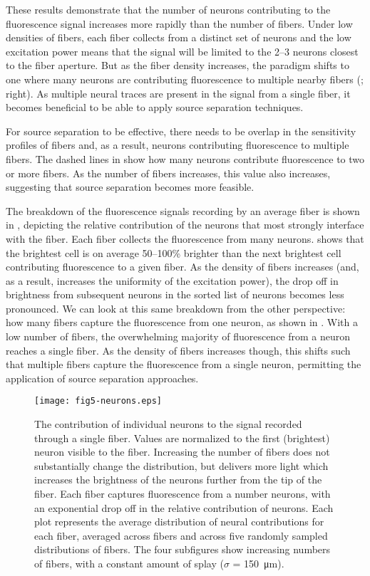 These results demonstrate that the number of neurons contributing to the fluorescence signal increases more rapidly than the number of fibers. Under low densities of fibers, each fiber collects from a distinct set of neurons and the low excitation power means that the signal will be limited to the 2--3 neurons closest to the fiber aperture. But as the fiber density increases, the paradigm shifts to one where many neurons are contributing fluorescence to multiple nearby fibers (; right). As multiple neural traces are present in the signal from a single fiber, it becomes beneficial to be able to apply source separation techniques.

For source separation to be effective, there needs to be overlap in the sensitivity profiles of fibers and, as a result, neurons contributing fluorescence to multiple fibers. The dashed lines in  show how many neurons contribute fluorescence to two or more fibers. As the number of fibers increases, this value also increases, suggesting that source separation becomes more feasible.

The breakdown of the fluorescence signals recording by an average fiber is shown in , depicting the relative contribution of the neurons that most strongly interface with the fiber. Each fiber collects the fluorescence from many neurons.  shows that the brightest cell is on average 50--100\% brighter than the next brightest cell contributing fluorescence to a given fiber. As the density of fibers increases (and, as a result, increases the uniformity of the excitation power), the drop off in brightness from subsequent neurons in the sorted list of neurons becomes less pronounced. We can look at this same breakdown from the other perspective: how many fibers capture the fluorescence from one neuron, as shown in . With a low number of fibers, the overwhelming majority of fluorescence from a neuron reaches a single fiber. As the density of fibers increases though, this shifts such that multiple fibers capture the fluorescence from a single neuron, permitting the application of source separation approaches.

\begin{figure}
\texttt{[image: fig5-neurons.eps]}
\caption[Contribution of neurons to fiber in descending order]{The contribution of individual neurons to the signal recorded through a single fiber. Values are normalized to the first (brightest) neuron visible to the fiber. Increasing the number of fibers does not substantially change the distribution, but delivers more light which increases the brightness of the neurons further from the tip of the fiber. Each fiber captures fluorescence from a number neurons, with an exponential drop off in the relative contribution of neurons. Each plot represents the average distribution of neural contributions for each fiber, averaged across fibers and across five randomly sampled distributions of fibers. The four subfigures show increasing numbers of fibers, with a constant amount of splay ($\sigma$ = 150~\si{\micro\meter}).}
\label{fig:neurons}
\end{figure}

